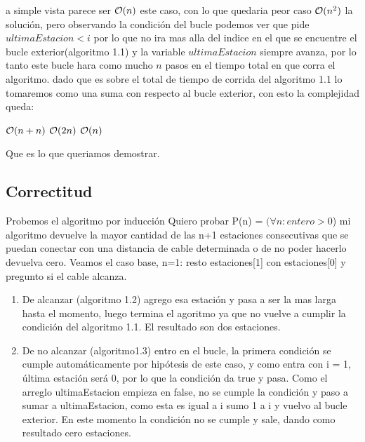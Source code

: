 a simple vista parece ser $\mathcal{O}(n)$ este caso, con lo que quedaria peor caso $\mathcal{O}(n^2)$ la soluci\'on, pero observando la condici\'on del bucle podemos ver que pide $ultimaEstacion < i$ por lo que no ira mas alla del indice en el que se encuentre el bucle exterior(algoritmo 1.1) y la variable $ultimaEstacion$ siempre avanza, por lo tanto este bucle hara como mucho $n$ pasos en el tiempo total en que corra el algoritmo. dado que es sobre el total de tiempo de corrida del algoritmo 1.1 lo tomaremos como una suma con respecto al bucle exterior, con esto la complejidad queda:\newline

\begin{center}
    $\mathcal{O}(n + n)$ \newline \newline
    $\mathcal{O}(2n)$ \newline \newline
    $\mathcal{O}(n)$ \newline \newline
\end{center}

Que es lo que queriamos demostrar.

\subsection{Correctitud}     
Probemos el algoritmo por inducci\'on \newline
Quiero probar P(n) = $(\forall n : entero > 0$) mi algoritmo devuelve la mayor cantidad de las n+1 estaciones consecutivas que se puedan conectar con una distancia de cable determinada o de no poder hacerlo devuelva cero. \newline
Veamos el caso base, n=1: \newline
resto estaciones[1] con estaciones[0] y pregunto si el cable alcanza.\newline

\begin{enumerate}
    \item De alcanzar (algoritmo 1.2) agrego esa estaci\'on y pasa a ser la mas larga hasta el momento, luego termina el agoritmo ya que no vuelve a cumplir la condici\'on del algoritmo 1.1. El resultado son dos estaciones. \newline
    \item De no alcanzar (algoritmo1.3) entro en el bucle, la primera condici\'on se cumple autom\'aticamente por hip\'otesis de este caso, y como entra con i = 1, \'ultima estaci\'on ser\'a 0, por lo que la condici\'on da true y pasa. Como el arreglo ultimaEstacion empieza en false, no se cumple la condici\'on y paso a sumar a ultimaEstacion, como esta es igual a i sumo 1 a i y vuelvo al bucle exterior. En este momento la condici\'on no se cumple y sale, dando como resultado cero estaciones. 
\end{enumerate}


